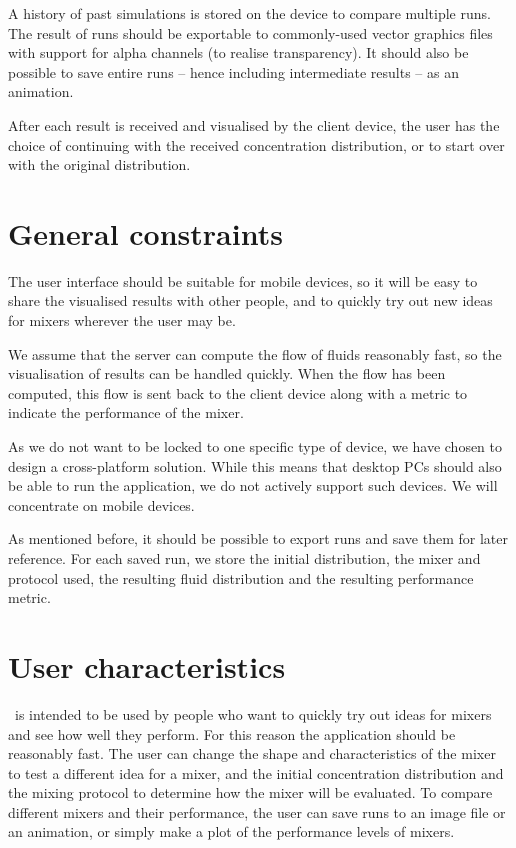 A history of past simulations is stored on the device to compare multiple runs. The result of runs should be exportable to commonly-used vector graphics files with support for alpha channels (to realise transparency). It should also be possible to save entire runs -- hence including intermediate results -- as an animation.

After each result is received and visualised by the client device, the user has the choice of continuing with the received concentration distribution, or to start over with the original distribution.

\section{General constraints}
The user interface should be suitable for mobile devices, so it will be easy to share the visualised results with other people, and to quickly try out new ideas for mixers wherever the user may be.

We assume that the server can compute the flow of fluids reasonably fast, so the visualisation of results can be handled quickly. When the flow has been computed, this flow is sent back to the client device along with a metric to indicate the performance of the mixer.

As we do not want to be locked to one specific type of device, we have chosen to design a cross-platform solution. While this means that desktop PCs should also be able to run the application, we do not actively support such devices. We will concentrate on mobile devices.

As mentioned before, it should be possible to export runs and save them for later reference. For each saved run, we store the initial distribution, the mixer and protocol used, the resulting fluid distribution and the resulting performance metric.

\section{User characteristics}
\projectname\ is intended to be used by people who want to quickly try out ideas for mixers and see how well they perform. For this reason the application should be reasonably fast. The user can change the shape and characteristics of the mixer to test a different idea for a mixer, and the initial concentration distribution and the mixing protocol to determine how the mixer will be evaluated. To compare different mixers and their performance, the user can save runs to an image file or an animation, or simply make a plot of the performance levels of mixers.

